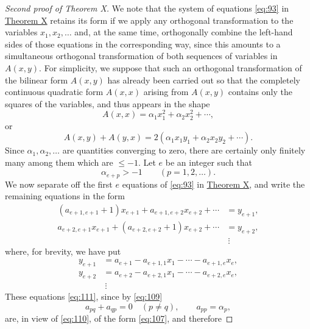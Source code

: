 \documentclass[b5paper,twoside]{article}
\newcommand{\originalpage}[1]{\phantomsection\label{origpage:#1}}
\begin{document}
\begin{proof}[Second proof of Theorem X]
We note that the system of equations \eqref{eq:93} in
\hyperref[thm:X]{Theorem X} retains its form if we apply any orthogonal
transformation to the variables $x_1,x_2,\ldots$ and, at the same time,
orthogonally combine the left-hand sides of those equations in the
corresponding way, since this amounts to a simultaneous orthogonal
transformation of both sequences of variables in $A(x,y)$. For simplicity,
we suppose that such an orthogonal transformation of the bilinear form
$A(x,y)$ has already been carried out so that the completely continuous
quadratic form $A(x,x)$ arising from $A(x,y)$ contains only the squares of
the variables, and thus appears in the shape
\[
  A(x,x)=\alpha_1x_1^2+\alpha_2x_2^2+\cdots,
\]
or
\begin{equation}
  A(x,y)+A(y,x)=2(\alpha_1x_1y_1+\alpha_2x_2y_2+\cdots).
  \tag{109}\label{eq:109}
\end{equation}
Since $\alpha_1,\alpha_2,\ldots$ are quantities converging to zero, there
are certainly only finitely many among them which are $\leq-1$. Let $e$ be
an integer such that
\begin{equation}
  \alpha_{e+p}>-1\qquad(p=1,2,\ldots).
  \tag{110}\label{eq:110}
\end{equation}
We now separate off the first $e$ equations of \eqref{eq:93} in
\hyperref[thm:X]{Theorem X}, and write the remaining equations in the form
\begin{equation}
  \begin{aligned}
    (a_{e+1,e+1}+1)x_{e+1}+a_{e+1,e+2}x_{e+2}+\cdots&=y_{e+1},\\
    a_{e+2,e+1}x_{e+1}+(a_{e+2,e+2}+1)x_{e+2}+\cdots&=y_{e+2},\\
    &\ \vdots
  \end{aligned}
  \tag{111}\label{eq:111}
\end{equation}
where, for brevity, we have put
\begin{equation}
  \begin{aligned}
    y_{e+1}&=a_{e+1}-a_{e+1,1}x_1-\cdots-a_{e+1,e}x_e,\\
    y_{e+2}&=a_{e+2}-a_{e+2,1}x_1-\cdots-a_{e+2,e}x_e,\\
    &\ \vdots
  \end{aligned}
  \tag{112}\label{eq:112}
\end{equation}
\originalpage{226}
These equations \eqref{eq:111}, since by \eqref{eq:109}
\[
  a_{pq}+a_{qp}=0\quad(p\ne q),
  \qquad
  a_{pp}=\alpha_p,
\]
are, in view of \eqref{eq:110}, of the form \eqref{eq:107}, and therefore

\end{proof}
\end{document}
